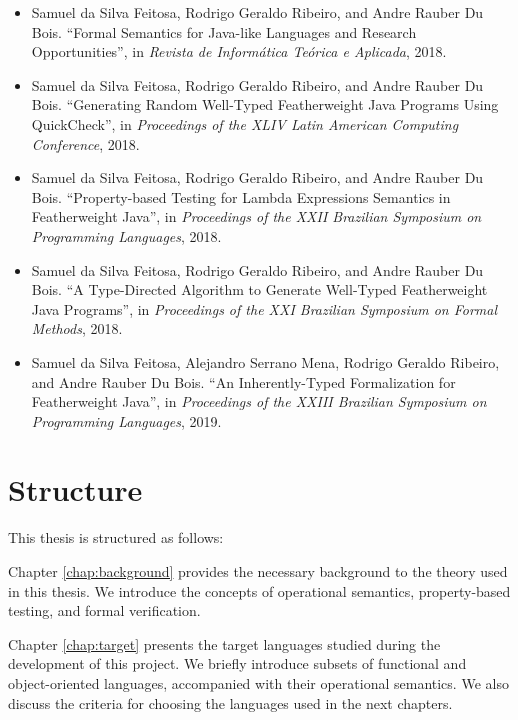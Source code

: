 \documentclass[tese,capa,english]{texufpel}
\begin{document}
\begin{itemize}
\item Samuel da Silva Feitosa, Rodrigo Geraldo Ribeiro, and Andre Rauber Du Bois. ``Formal Semantics for Java-like Languages and Research Opportunities'', in \emph{Revista de Inform\'{a}tica Te\'{o}rica e Aplicada}, 2018. \cite{feitosa2018-1}
\item Samuel da Silva Feitosa, Rodrigo Geraldo Ribeiro, and Andre Rauber Du Bois. ``Generating Random Well-Typed Featherweight Java Programs Using QuickCheck'', in \emph{Proceedings of the XLIV Latin American Computing Conference}, 2018. \cite{feitosa2018-2}
\item Samuel da Silva Feitosa, Rodrigo Geraldo Ribeiro, and Andre Rauber Du Bois. ``Property-based Testing for Lambda Expressions Semantics in Featherweight Java'', in \emph{Proceedings of the XXII Brazilian Symposium on Programming Languages}, 2018. \cite{feitosa2018-3}
\item Samuel da Silva Feitosa, Rodrigo Geraldo Ribeiro, and Andre Rauber Du Bois. ``A Type-Directed Algorithm to Generate Well-Typed Featherweight Java Programs'', in \emph{Proceedings of the XXI Brazilian Symposium on Formal Methods}, 2018. \cite{feitosa2018-4}
\item Samuel da Silva Feitosa, Alejandro Serrano Mena, Rodrigo Geraldo Ribeiro, and Andre Rauber Du Bois. ``An Inherently-Typed Formalization for Featherweight Java'', in \emph{Proceedings of the XXIII Brazilian Symposium on Programming Languages}, 2019. \cite{feitosa2019-1}
\end{itemize}

\section{Structure}

This thesis is structured as follows:

\vspace{10pt}

Chapter \ref{chap:background} provides the necessary background to the theory used in this thesis. We introduce the concepts of operational semantics, property-based testing, and formal verification. 

\vspace{10pt}

Chapter \ref{chap:target} presents the target languages studied during the development of this project. We briefly introduce subsets of functional and object-oriented languages, accompanied with their operational semantics. We also discuss the criteria for choosing the languages used in the next chapters.
\end{document}
